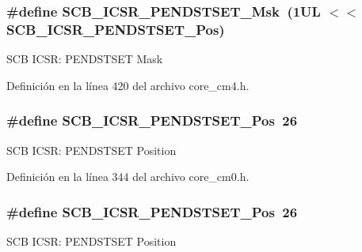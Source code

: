 \subsubsection[{\texorpdfstring{S\+C\+B\+\_\+\+I\+C\+S\+R\+\_\+\+P\+E\+N\+D\+S\+T\+S\+E\+T\+\_\+\+Msk}{SCB_ICSR_PENDSTSET_Msk}}]{\setlength{\rightskip}{0pt plus 5cm}\#define S\+C\+B\+\_\+\+I\+C\+S\+R\+\_\+\+P\+E\+N\+D\+S\+T\+S\+E\+T\+\_\+\+Msk~(1\+U\+L $<$$<$ S\+C\+B\+\_\+\+I\+C\+S\+R\+\_\+\+P\+E\+N\+D\+S\+T\+S\+E\+T\+\_\+\+Pos)}\hypertarget{group___c_m_s_i_s___s_c_b_ga7325b61ea0ec323ef2d5c893b112e546}{}\label{group___c_m_s_i_s___s_c_b_ga7325b61ea0ec323ef2d5c893b112e546}
S\+CB I\+C\+SR\+: P\+E\+N\+D\+S\+T\+S\+ET Mask 

Definición en la línea 420 del archivo core\+\_\+cm4.\+h.

\subsubsection[{\texorpdfstring{S\+C\+B\+\_\+\+I\+C\+S\+R\+\_\+\+P\+E\+N\+D\+S\+T\+S\+E\+T\+\_\+\+Pos}{SCB_ICSR_PENDSTSET_Pos}}]{\setlength{\rightskip}{0pt plus 5cm}\#define S\+C\+B\+\_\+\+I\+C\+S\+R\+\_\+\+P\+E\+N\+D\+S\+T\+S\+E\+T\+\_\+\+Pos~26}\hypertarget{group___c_m_s_i_s___s_c_b_ga9dbb3358c6167c9c3f85661b90fb2794}{}\label{group___c_m_s_i_s___s_c_b_ga9dbb3358c6167c9c3f85661b90fb2794}
S\+CB I\+C\+SR\+: P\+E\+N\+D\+S\+T\+S\+ET Position 

Definición en la línea 344 del archivo core\+\_\+cm0.\+h.

\subsubsection[{\texorpdfstring{S\+C\+B\+\_\+\+I\+C\+S\+R\+\_\+\+P\+E\+N\+D\+S\+T\+S\+E\+T\+\_\+\+Pos}{SCB_ICSR_PENDSTSET_Pos}}]{\setlength{\rightskip}{0pt plus 5cm}\#define S\+C\+B\+\_\+\+I\+C\+S\+R\+\_\+\+P\+E\+N\+D\+S\+T\+S\+E\+T\+\_\+\+Pos~26}\hypertarget{group___c_m_s_i_s___s_c_b_ga9dbb3358c6167c9c3f85661b90fb2794}{}\label{group___c_m_s_i_s___s_c_b_ga9dbb3358c6167c9c3f85661b90fb2794}
S\+CB I\+C\+SR\+: P\+E\+N\+D\+S\+T\+S\+ET Position 

